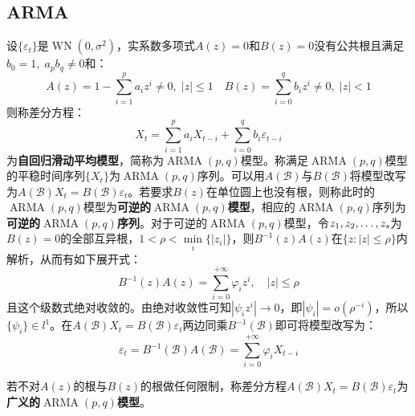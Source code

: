 \subsection{ARMA}
\begin{definition}
	设$\{\varepsilon_t\}$是$\operatorname{WN}(0,\sigma^2)$，实系数多项式$A(z)=0$和$B(z)=0$没有公共根且满足$b_0=1,\;a_pb_q\ne0$和：
	\begin{equation*}
		A(z)=1-\sum_{i=1}^{p}a_iz^i\ne0,\;|z|\leqslant1\quad B(z)=\sum_{i=0}^{q}b_iz^i\ne0,\;|z|<1
	\end{equation*}
	则称差分方程：
	\begin{equation*}
		X_t=\sum_{i=1}^{p}a_iX_{t-i}+\sum_{i=0}^{q}b_i\varepsilon_{t-i}
	\end{equation*}
	为\textbf{自回归滑动平均模型}，简称为$\operatorname{ARMA}(p,q)$模型。称满足$\operatorname{ARMA}(p,q)$模型的平稳时间序列$\{X_t\}$为$\operatorname{ARMA}(p,q)$序列。可以用$A(\mathcal{B})$与$B(\mathcal{B})$将模型改写为$A(\mathcal{B})X_t=B(\mathcal{B})\varepsilon_t$。若要求$B(z)$在单位圆上也没有根，则称此时的$\operatorname{ARMA}(p,q)$模型为\textbf{可逆的$\operatorname{ARMA}(p,q)$模型}，相应的$\operatorname{ARMA}(p,q)$序列为\textbf{可逆的$\operatorname{ARMA}(p,q)$序列}。对于可逆的$\operatorname{ARMA}(p,q)$模型，令$z_1, z_2, \dots, z_{s}$为$B(z)=0$的全部互异根，$1<\rho<\min\limits_i\{|z_i|\}$，则$B^{-1}(z)A(z)$在$\{z:|z|\leqslant\rho\}$内解析，从而有如下展开式：
	\begin{equation*}
		B^{-1}(z)A(z)=\sum_{i=0}^{+\infty}\varphi_iz^i,\quad|z|\leqslant\rho
	\end{equation*}
	且这个级数式绝对收敛的。由绝对收敛性可知$|\psi_iz^i|\to0$，即$|\psi_i|=o(\rho^{-i})$，所以$\{\psi_i\}\in l^1$。在$A(\mathcal{B})X_t=B(\mathcal{B})\varepsilon_t$两边同乘$B^{-1}(\mathcal{B})$即可将模型改写为：
	\begin{equation*}
		\varepsilon_t=B^{-1}(\mathcal{B})A(\mathcal{B})=\sum_{i=0}^{+\infty}\varphi_iX_{t-i}
	\end{equation*}\par
	若不对$A(z)$的根与$B(z)$的根做任何限制，称差分方程$A(\mathcal{B})X_t=B(\mathcal{B})\varepsilon_t$为\textbf{广义的$\operatorname{ARMA}(p,q)$模型}。
\end{definition}
